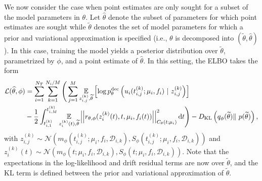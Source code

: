 \documentclass{article}
\begin{document}
	
	We now consider the case when point estimates are only sought for a subset of the model parameters in $\theta$. Let $\widehat{\theta}$ denote the subset of parameters for which point estimates are sought 
	while $\widetilde{\theta}$ denotes the set of model parameters for 
	which a prior and variational approximation is specified (i.e., $\theta$ is decomposed into $(\widetilde{\theta},\widehat{\theta})$). In this case, training the model yields a posterior distribution over $\widetilde{\theta}$, parametrized by $\phi$, and a point estimate of $\widehat{\theta}$. In this setting, the ELBO takes the form
	\begin{align} \label{eqn:partialprior_amortized_elbo}
		\mathcal{L}(\widehat{\theta}, \phi) & = \sum_{i=1}^{N_T} 
		\sum_{k=1}^{N_i/M}
		\Bigg( \sum_{j=1}^{M} 
		\underset{ z_{i,j}^{(k)}, \widetilde{\theta} }{\mathbb{E}}
		\left [ \log p_{\theta}^{\rm dec} \left ( u_{i}(t_{i,j}^{(k)};  \mu_i, f_i)\ |\ z_{i,j}^{(k)} \right )  \right ] \nonumber \\
		& - \frac{1}{2} \int_{t_{i,1}^{(k)}}^{t_{i,M}^{(k)}}
		\underset{z_i^{(k)} (t), \widetilde{\theta}}{\mathbb{E}}
		\left | \left | r_{\theta, \phi} (z_i^{(k)}(t), t, \mu_i, f_i(t)) \right | \right |_{C_{\theta}(t;\mu_i)}^2 \text{d}t \Bigg) - D_{\textrm{KL}}\left(q_\phi(\widetilde{\theta}) \|\ p(\widetilde{\theta})\right),
	\end{align}
	with $z_{i,j}^{(k)} \sim \mathcal{N} ( m_\phi(t_{i,j}^{(k)}; \mu_i, f_i, \mathcal{D}_{i,k}), S_\phi (t_{i,j}^{(k)}; \mu_i, f_i, \mathcal{D}_{i,k}) )$ and $z_i^{(k)}(t) \sim \mathcal{N} ( m_\phi(t; \mu_i, f_i, \mathcal{D}_{i,k}), S_\phi (t; \mu_i, f_i, \mathcal{D}_{i,k}) )$.
	Note that the expectations in the log-likelihood and drift residual terms are now over $\widetilde{\theta}$, and the KL term is  defined between the prior and variational approximation of $\widetilde{\theta}$.
	
\end{document}
